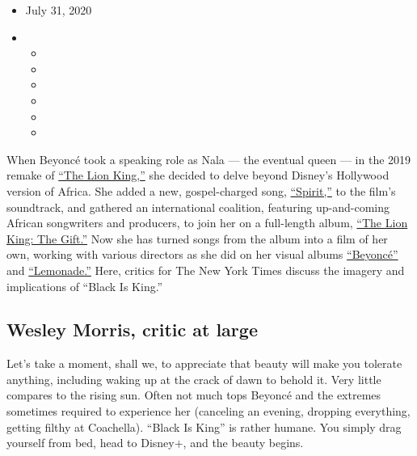 \begin{itemize}
\item
  July 31, 2020
\item
  \begin{itemize}
  \item
  \item
  \item
  \item
  \item
  \item
  \end{itemize}
\end{itemize}

When Beyoncé took a speaking role as Nala --- the eventual queen --- in
the 2019 remake of
\href{https://www.nytimes3xbfgragh.onion/2019/07/11/movies/the-lion-king-review.html}{``The
Lion King,''} she decided to delve beyond Disney's Hollywood version of
Africa. She added a new, gospel-charged song,
\href{https://www.nytimes3xbfgragh.onion/2019/07/12/arts/music/playlist-beyonce-billie-eilish-justin-bieber-ed-sheeran.html}{``Spirit,''}
to the film's soundtrack, and gathered an international coalition,
featuring up-and-coming African songwriters and producers, to join her
on a full-length album,
\href{https://www.nytimes3xbfgragh.onion/2019/07/24/arts/music/beyonce-the-lion-king-the-gift-review.html}{``The
Lion King: The Gift.''} Now she has turned songs from the album into a
film of her own, working with various directors as she did on her visual
albums
\href{https://www.nytimes3xbfgragh.onion/2013/12/14/arts/music/beyonces-new-album-is-steamy-and-sleek.html}{``Beyoncé''}
and
\href{https://www.nytimes3xbfgragh.onion/2016/04/25/arts/music/beyonce-lemonade.html}{``Lemonade.''}
Here, critics for The New York Times discuss the imagery and
implications of ``Black Is King.''

\hypertarget{wesley-morris-critic-at-large}{%
\subsection{Wesley Morris, critic at
large}\label{wesley-morris-critic-at-large}}

Let's take a moment, shall we, to appreciate that beauty will make you
tolerate anything, including waking up at the crack of dawn to behold
it. Very little compares to the rising sun. Often not much tops Beyoncé
and the extremes sometimes required to experience her (canceling an
evening, dropping everything, getting filthy at Coachella). ``Black Is
King'' is rather humane. You simply drag yourself from bed, head to
Disney+, and the beauty begins.

